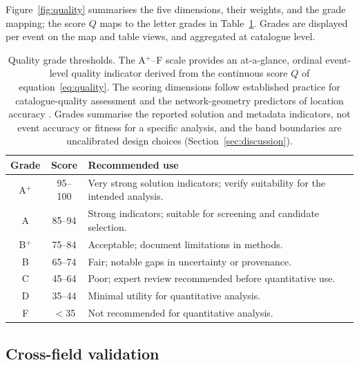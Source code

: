 \documentclass[12pt]{article}
\begin{document}
Figure~\ref{fig:quality} summarises the five dimensions, their weights, and the
grade mapping; the score $Q$ maps to the letter grades in
Table~\ref{tab:grades}.  Grades are displayed per event on the map and table
views, and aggregated at catalogue level.

\begin{table}[ht]
\centering
\caption{Quality grade thresholds. The A$^+$--F scale provides an at-a-glance,
ordinal event-level quality indicator derived from the continuous score $Q$ of
equation~\eqref{eq:quality}.  The scoring dimensions follow established practice
for catalogue-quality assessment \citep{woessner2005} and the network-geometry
predictors of location accuracy \citep{bondar2004,warrensmith2025}.  Grades
summarise the reported solution and metadata indicators, not event accuracy or
fitness for a specific analysis, and the band boundaries are uncalibrated design
choices (Section~\ref{sec:discussion}).}
\label{tab:grades}
\begin{tabular}{@{}ccp{7.5cm}@{}}
\toprule
\textbf{Grade} & \textbf{Score} & \textbf{Recommended use} \\
\midrule
A$^+$ & 95--100 & Very strong solution indicators; verify suitability for the intended analysis. \\
A     & 85--94  & Strong indicators; suitable for screening and candidate selection. \\
B$^+$ & 75--84  & Acceptable; document limitations in methods. \\
B     & 65--74  & Fair; notable gaps in uncertainty or provenance. \\
C     & 45--64  & Poor; expert review recommended before quantitative use. \\
D     & 35--44  & Minimal utility for quantitative analysis. \\
F     & $<$35   & Not recommended for quantitative analysis. \\
\bottomrule
\end{tabular}
\end{table}

\subsection{Cross-field validation}
\label{sec:crossfield}
\end{document}
